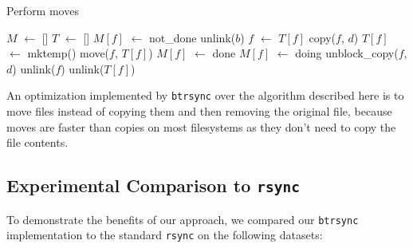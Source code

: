 \documentclass[11pt]{llncs}
\newcommand*\Let[2]{\State #1 $\gets$ #2}
\newcommand{\btrsync}{\texttt{btrsync}\xspace}
\newcommand{\rsync}{\texttt{rsync}\xspace}
\begin{document}
\begin{algorithm}
  \caption{Perform moves}
  \label{alg:moves}
  \begin{algorithmic}[1]
    \Statex
    \Let{$M$}{[]}
    \Let{$T$}{[]}
      \Let{$M[f]$}{not\_done}
    \EndFor
          \State unlink($b$) 
        \Else
          \State {} 
        \EndIf
      \EndIf
        \Let{$f$}{$T[f]$}
      \EndIf
      \State copy($f$, $d$)
    \EndFunction
        \State \Return {}
      \EndIf
        \Let{$T[f]$}{mktemp()}
        \State move($f$, $T[f]$)
        \Let{$M[f]$}{done}
        \State \Return {}
      \EndIf
      \Let{$M[f]$}{doing}
          \State unblock\_copy($f$, $d$) 
        \EndIf
      \EndFor
        \State unlink($f$)
      \EndIf
        \State unlink($T[f]$)
      \EndIf
    \EndFunction

      \State {}
    \EndFor
  \end{algorithmic}
\end{algorithm}

An optimization implemented by \btrsync over the algorithm described here is to
move files instead of copying them and then removing the original file, because
moves are faster than copies on most filesystems as they don't need to copy the
file contents.



\subsection{Experimental Comparison to \rsync}

To demonstrate the benefits of our approach, we compared our \btrsync
implementation to the standard \rsync on the following datasets:
\end{document}
